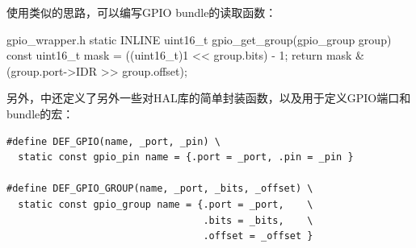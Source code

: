 使用类似的思路，可以编写GPIO bundle的读取函数：

\begin{cbox}{gpio\_wrapper.h}
static INLINE uint16_t
gpio_get_group(gpio_group group)
{
  const uint16_t mask = ((uint16_t)1 << group.bits) - 1;
  return mask & (group.port->IDR >> group.offset);
}
\end{cbox}

另外，中还定义了另外一些对HAL库的简单封装函数，以及用于定义GPIO端口和
bundle的宏：

\begin{verbatim}
#define DEF_GPIO(name, _port, _pin) \
  static const gpio_pin name = {.port = _port, .pin = _pin }

#define DEF_GPIO_GROUP(name, _port, _bits, _offset) \
  static const gpio_group name = {.port = _port,    \
                                  .bits = _bits,    \
                                  .offset = _offset }
\end{verbatim}
